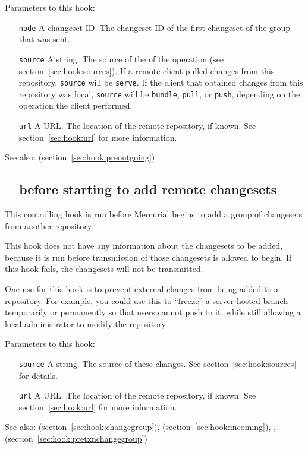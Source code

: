 Parameters to this hook:
\begin{itemize}
\item[\texttt{node}] A changeset ID.  The changeset ID of the first
  changeset of the group that was sent.
\item[\texttt{source}] A string.  The source of the of the operation
  (see section~\ref{sec:hook:sources}).  If a remote client pulled
  changes from this repository, \texttt{source} will be
  \texttt{serve}.  If the client that obtained changes from this
  repository was local, \texttt{source} will be \texttt{bundle},
  \texttt{pull}, or \texttt{push}, depending on the operation the
  client performed.
\item[\texttt{url}] A URL.  The location of the remote repository, if
  known.  See section~\ref{sec:hook:url} for more information.
\end{itemize}

See also:  (section~\ref{sec:hook:preoutgoing})

\subsection{---before starting to add remote changesets}
\label{sec:hook:prechangegroup}

This controlling hook is run before Mercurial begins to add a group of
changesets from another repository.

This hook does not have any information about the changesets to be
added, because it is run before transmission of those changesets is
allowed to begin.  If this hook fails, the changesets will not be
transmitted.

One use for this hook is to prevent external changes from being added
to a repository.  For example, you could use this to ``freeze'' a
server-hosted branch temporarily or permanently so that users cannot
push to it, while still allowing a local administrator to modify the
repository.

Parameters to this hook:
\begin{itemize}
\item[\texttt{source}] A string.  The source of these changes.  See
  section~\ref{sec:hook:sources} for details.
\item[\texttt{url}] A URL.  The location of the remote repository, if
  known.  See section~\ref{sec:hook:url} for more information.
\end{itemize}

See also:  (section~\ref{sec:hook:changegroup}),
 (section~\ref{sec:hook:incoming}), ,
 (section~\ref{sec:hook:pretxnchangegroup})

